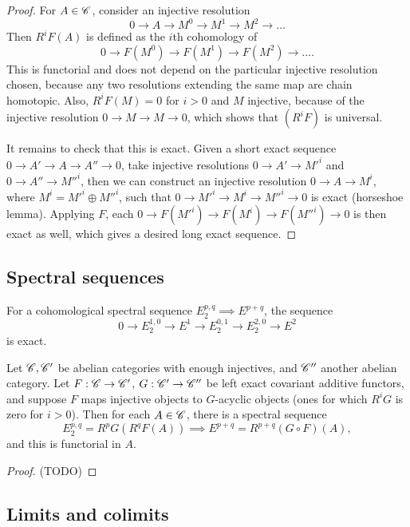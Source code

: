\documentclass[11pt]{amsart}
\begin{document}
\begin{proof}
    For $A\in \mathscr{C}$, consider an injective resolution
    \[0 \to A\to M^0 \to M^1\to M^2 \to\dots\]
    Then $R^i F(A)$ is defined as the $i$th cohomology of
    \[0 \to F(M^0) \to F(M^1) \to F(M^2) \to\dots.\]
    This is functorial and does not depend on the particular injective resolution chosen, because any two resolutions extending the same map are chain homotopic. Also, $R^iF(M) = 0$ for $i>0$ and $M$ injective, because of the injective resolution $0\to M\to M\to 0$, which shows that $(R^iF)$ is universal.
    
    It remains to check that this is exact. Given a short exact sequence $0\to A'\to A\to A''\to 0$, take injective resolutions $0\to A'\to M'^i$ and $0\to A'' \to M''^i$, then we can construct an injective resolution $0\to A \to M^i$, where $M^i = M'^i \oplus M''^i$, such that $0\to M'^i \to M^i\to M''^i\to 0$ is exact (horseshoe lemma). Applying $F$, each $0\to F(M'^i) \to F(M^i)\to F(M''^i)\to 0$ is then exact as well, which gives a desired long exact sequence.
\end{proof}


\subsection{Spectral sequences}

\begin{prop}
For a cohomological spectral sequence $E_2^{p,q} \implies E^{p+q}$, the sequence
\[0 \to E_2^{1,0} \to E^{1} \to E_2^{0,1} \to E_2^{2,0} \to E^{2}\]
is exact.
\end{prop}

\begin{thm}
    Let $\mathscr{C}, \mathscr{C}'$ be abelian categories with enough injectives, and $\mathscr{C}''$ another abelian category. Let $F: \mathscr{C}\to \mathscr{C}'$, $G: \mathscr{C}' \to \mathscr{C}''$ be left exact covariant additive functors, and suppose $F$ maps injective objects to $G$-acyclic objects (ones for which $R^iG$ is zero for $i>0$). Then for each $A\in \mathscr{C}$, there is a spectral sequence
    \[E_2^{p,q} = R^pG(R^qF(A)) \implies E^{p+q} = R^{p+q}(G\circ F)(A),\]
    and this is functorial in $A$.
\end{thm}

\begin{proof}
    (TODO)
\end{proof}



\subsection{Limits and colimits}
\end{document}

